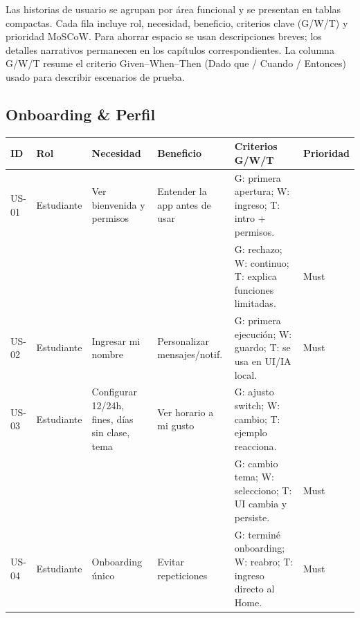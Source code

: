 \noindent Las historias de usuario se agrupan por área funcional y se presentan en tablas compactas. Cada fila incluye rol, necesidad, beneficio, criterios clave (G/W/T) y prioridad MoSCoW. Para ahorrar espacio se usan descripciones breves; los detalles narrativos permanecen en los capítulos correspondientes. La columna G/W/T resume el criterio Given--When--Then (Dado que / Cuando / Entonces) usado para describir escenarios de prueba.

\medskip

\subsection{Onboarding \& Perfil}
\small
\captionsetup{type=table}
\label{tab:hu_onboarding}
\begin{tabularx}{\linewidth}{@{}P{1.15cm}P{2.3cm}XP{2.3cm}XP{1.2cm}@{}}
\toprule
ID & Rol & Necesidad & Beneficio & Criterios G/W/T & Prioridad \\
\midrule
US-01 & Estudiante & Ver bienvenida y permisos & Entender la app antes de usar & G: primera apertura; W: ingreso; T: intro + permisos.\\[-0.4em]
 & & & & G: rechazo; W: continuo; T: explica funciones limitadas. & Must \\
US-02 & Estudiante & Ingresar mi nombre & Personalizar mensajes/notif. & G: primera ejecución; W: guardo; T: se usa en UI/IA local. & Must \\
US-03 & Estudiante & Configurar 12/24h, fines, días sin clase, tema & Ver horario a mi gusto & G: ajusto switch; W: cambio; T: ejemplo reacciona.\\[-0.4em]
 & & & & G: cambio tema; W: selecciono; T: UI cambia y persiste. & Must \\
US-04 & Estudiante & Onboarding único & Evitar repeticiones & G: terminé onboarding; W: reabro; T: ingreso directo al Home. & Must \\
\bottomrule
\end{tabularx}
\normalsize

\medskip

